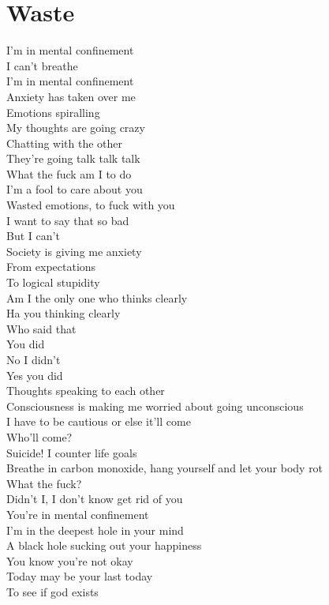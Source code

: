 \documentclass[12pt, b5paper]{article}
\begin{document}
\section{Waste}
I'm in mental confinement
\\I can't breathe
\\I'm in mental confinement
\\Anxiety has taken over me
\\Emotions spiralling
\\My thoughts are going crazy
\\Chatting with the other
\\They're going talk talk talk
\\What the fuck am I to do
\\I'm a fool to care about you
\\Wasted emotions, to fuck with you
\\I want to say that so bad
\\But I can't
\\Society is giving me anxiety
\\From expectations
\\To logical stupidity
\\Am I the only one who thinks clearly
\\Ha you thinking clearly
\\Who said that
\\You did
\\No I didn't
\\Yes you did
\\Thoughts speaking to each other
\\Consciousness is making me worried about going unconscious
\\I have to be cautious or else it'll come
\\Who'll come?
\\Suicide! I counter life goals
\\Breathe in carbon monoxide, hang yourself and let your body rot
\\What the fuck?
\\Didn't I, I don't know get rid of you
\\You're in mental confinement
\\I'm in the deepest hole in your mind
\\A black hole sucking out your happiness
\\You know you're not okay
\\Today may be your last today
\\To see if god exists
\end{document}
